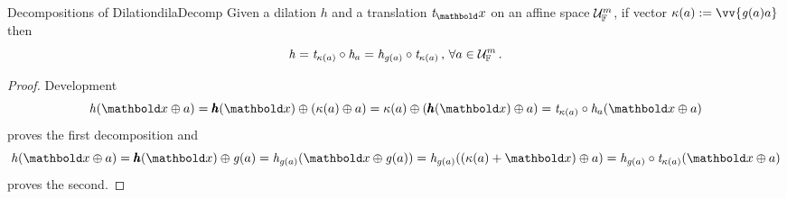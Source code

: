 \begin{mteo}{Decompositions of Dilation}{dilaDecomp}
Given a dilation $\mathit{h}$ and a translation $\mathit{t}_\vto{x}$ on an affine space $\eamd{U}{F}{m}$, if vector $\fua{\kappa}{a}:=\vv{\fua{\mathit{g}}{a}a}$ then
\begin{equation*}
\mathit{h} = \mathit{t}_{\fua{\kappa}{a}}\circ\mathit{h}_a=\mathit{h}_{\fua{\mathit{g}}{a}}\circ\mathit{t}_{\fua{\kappa}{a}}\,,\,\forall a\in\eamd{U}{F}{m}\,.
\end{equation*}
\end{mteo}

{\footnotesize
\begin{proof}
Development
\begin{equation*}
\fua{\mathit{h}}{\vto{x}\oplus a} = \fua{\vtf{h}}{\vto{x}}\oplus (\fua{\kappa}{a}\oplus a) = \fua{\kappa}{a}\oplus (\fua{\vtf{h}}{\vto{x}}\oplus a) = \fua{\mathit{t}_{\fua{\kappa}{a}}\circ\mathit{h}_a}{\vto{x}\oplus a}
\end{equation*}
proves the first decomposition and
\begin{equation*}
\fua{\mathit{h}}{\vto{x}\oplus a} = \fua{\vtf{h}}{\vto{x}}\oplus \fua{\mathit{g}}{a} = \fua{\mathit{h}_{\fua{\mathit{g}}{a}}}{\vto{x}\oplus \fua{\mathit{g}}{a}} = \fua{\mathit{h}_{\fua{\mathit{g}}{a}}}{(\fua{\kappa}{a}+\vto{x})\oplus a} = \fua{\mathit{h}_{\fua{\mathit{g}}{a}}\circ\mathit{t}_{\fua{\kappa}{a}}}{\vto{x}\oplus a}
\end{equation*}
proves the second.
\end{proof}}


